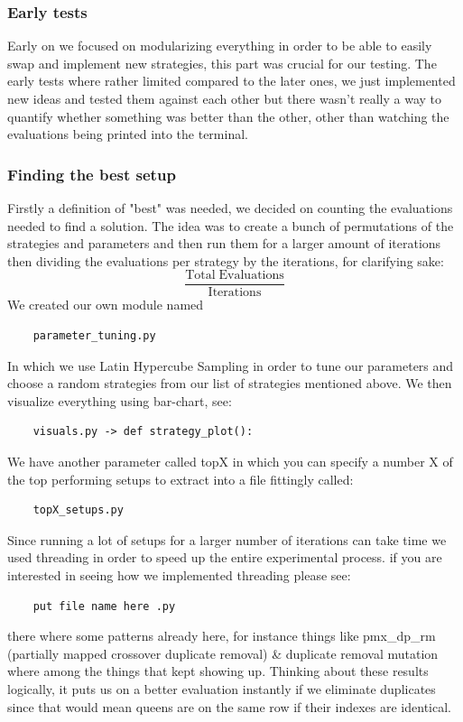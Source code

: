 \subsubsection{Early tests}
Early on we focused on modularizing everything in order to be able to easily swap and implement new strategies, this part was crucial for our testing. The early tests where rather limited compared to the later ones, we just implemented new ideas and tested them against each other but there wasn't really a way to quantify whether something was better than the other, other than watching the evaluations being printed into the terminal.
\subsubsection{Finding the best setup}
Firstly a definition of "best" was needed, we decided on counting the evaluations needed to find a solution. The idea was to create a bunch of permutations of the strategies and parameters and then run them for a larger amount of iterations then dividing the evaluations per strategy by the iterations, for clarifying sake:
\begin{equation}
\frac{\text{Total}\; \text{Evaluations}}{\text{Iterations}}
\end{equation}
We created our own module named
\begin{verbatim}
    parameter_tuning.py
\end{verbatim}
In which we use Latin Hypercube Sampling in order to tune our parameters and choose a random strategies from our list of strategies mentioned above. We then visualize everything using bar-chart, see:
\begin{verbatim}
    visuals.py -> def strategy_plot():
\end{verbatim}
We have another parameter called topX in which you can specify a number X of the top performing setups to extract into a file fittingly called:
\begin{verbatim}
    topX_setups.py
\end{verbatim}
Since running a lot of setups for a larger number of iterations can take time we used threading in order to speed up the entire experimental process. if you are interested in seeing how we implemented threading please see:
\begin{verbatim}
    put file name here .py
\end{verbatim}
there where some patterns already here, for instance things like pmx\_dp\_rm (partially mapped crossover duplicate removal) \& duplicate removal mutation where among the things that kept showing up. Thinking about these results logically, it puts us on a better evaluation instantly if we eliminate duplicates since that would mean queens are on the same row if their indexes are identical.
